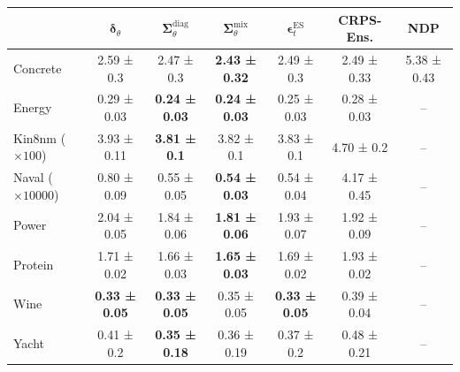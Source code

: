 \begin{tabular}{l|c|c|c|c|c|c}
\toprule
 & $\bm\delta_\theta$ & $\bm\Sigma_\theta^{\mathrm{diag}}$ & $\bm\Sigma_\theta^{\mathrm{mix}}$ & $\bm\epsilon_t^\mathrm{ES}$ & CRPS-Ens. & NDP \\
\midrule
Concrete & 2.59 ± 0.3 & 2.47 ± 0.3 & \textbf{2.43 ± 0.32} & 2.49 ± 0.3 & 2.49 ± 0.33 & 5.38 ± 0.43 \\
Energy & 0.29 ± 0.03 & \textbf{0.24 ± 0.03} & \textbf{0.24 ± 0.03} & 0.25 ± 0.03 & 0.28 ± 0.03 & -- \\
Kin8nm ($\times 100$) & 3.93 ± 0.11 & \textbf{3.81 ± 0.1} & 3.82 ± 0.1 & 3.83 ± 0.1 & 4.70 ± 0.2 & -- \\
Naval ($\times 10000$) & 0.80 ± 0.09 & 0.55 ± 0.05 & \textbf{0.54 ± 0.03} & 0.54 ± 0.04 & 4.17 ± 0.45 & -- \\
Power & 2.04 ± 0.05 & 1.84 ± 0.06 & \textbf{1.81 ± 0.06} & 1.93 ± 0.07 & 1.92 ± 0.09 & -- \\
Protein & 1.71 ± 0.02 & 1.66 ± 0.03 & \textbf{1.65 ± 0.03} & 1.69 ± 0.02 & 1.93 ± 0.02 & -- \\
Wine & \textbf{0.33 ± 0.05} & \textbf{0.33 ± 0.05} & 0.35 ± 0.05 & \textbf{0.33 ± 0.05} & 0.39 ± 0.04 & -- \\
Yacht & 0.41 ± 0.2 & \textbf{0.35 ± 0.18} & 0.36 ± 0.19 & 0.37 ± 0.2 & 0.48 ± 0.21 & -- \\
\bottomrule
\end{tabular}
